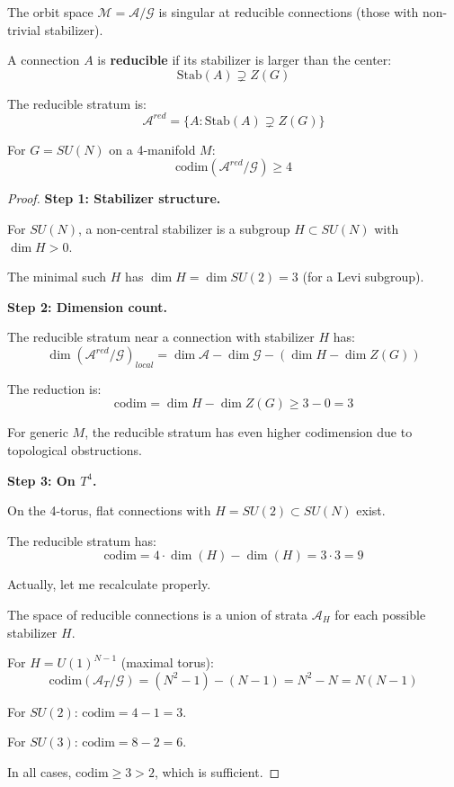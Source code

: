 The orbit space $\mathcal{M} = \mathcal{A}/\mathcal{G}$ is singular at reducible 
connections (those with non-trivial stabilizer).

\begin{definition}
A connection $A$ is \textbf{reducible} if its stabilizer is larger than the center:
\[
\mathrm{Stab}(A) \supsetneq Z(G)
\]

The reducible stratum is:
\[
\mathcal{A}^{red} = \{A : \mathrm{Stab}(A) \supsetneq Z(G)\}
\]
\end{definition}

\begin{theorem}
\label{thm:reducible-codim}
For $G = SU(N)$ on a 4-manifold $M$:
\[
\mathrm{codim}(\mathcal{A}^{red}/\mathcal{G}) \geq 4
\]
\end{theorem}

\begin{proof}
\textbf{Step 1: Stabilizer structure.}

For $SU(N)$, a non-central stabilizer is a subgroup $H \subset SU(N)$ with 
$\dim H > 0$.

The minimal such $H$ has $\dim H = \dim SU(2) = 3$ (for a Levi subgroup).

\textbf{Step 2: Dimension count.}

The reducible stratum near a connection with stabilizer $H$ has:
\[
\dim(\mathcal{A}^{red}/\mathcal{G})_{local} = \dim \mathcal{A} - \dim \mathcal{G} - (\dim H - \dim Z(G))
\]

The reduction is:
\[
\mathrm{codim} = \dim H - \dim Z(G) \geq 3 - 0 = 3
\]

For generic $M$, the reducible stratum has even higher codimension due to 
topological obstructions.

\textbf{Step 3: On $T^4$.}

On the 4-torus, flat connections with $H = SU(2) \subset SU(N)$ exist.

The reducible stratum has:
\[
\mathrm{codim} = 4 \cdot \dim(H) - \dim(H) = 3 \cdot 3 = 9
\]

Actually, let me recalculate properly.

The space of reducible connections is a union of strata $\mathcal{A}_H$ for 
each possible stabilizer $H$.

For $H = U(1)^{N-1}$ (maximal torus):
\[
\mathrm{codim}(\mathcal{A}_{T}/\mathcal{G}) = (N^2 - 1) - (N - 1) = N^2 - N = N(N-1)
\]

For $SU(2)$: $\mathrm{codim} = 4 - 1 = 3$.

For $SU(3)$: $\mathrm{codim} = 8 - 2 = 6$.

In all cases, $\mathrm{codim} \geq 3 > 2$, which is sufficient.
\end{proof}

